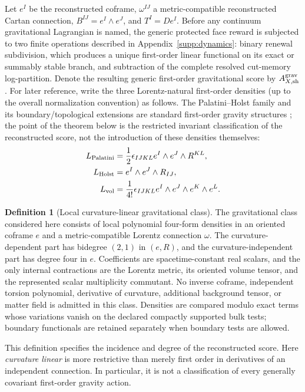 \documentclass[11pt]{article}
\numberwithin{equation}{section}
\theoremstyle{definition}
\newtheorem{definition}[definition]{Definition}
\theoremstyle{remark}
\begin{document}
Let $e^I$ be the reconstructed coframe, $\omega^{IJ}$ a metric-compatible
reconstructed Cartan connection, $B^{IJ}=e^I\wedge e^J$, and $T^I=De^I$.
Before any continuum gravitational Lagrangian is named, the generic protected
face reward is subjected to two finite operations described in
Appendix~\ref{supp:dynamics}: binary renewal subdivision, which produces a unique
first-order linear functional on its exact or summably stable branch, and
subtraction of the complete resolved cut-memory log-partition.  Denote the
resulting generic first-order gravitational score by $A^{\rm grav}_{X,\rm sh}$.
For later reference, write the three Lorentz-natural first-order densities (up
to the overall normalization convention) as follows.  The Palatini--Holst
family and its boundary/topological extensions are standard first-order
gravity structures \cite{Holst1996,CorichiReview}; the point of the theorem
below is the restricted invariant classification of the reconstructed score,
not the introduction of these densities themselves:
\begin{align}
 L_{\rm Palatini}
 &=\frac12\epsilon_{IJKL}e^I\wedge e^J\wedge R^{KL},\\
 L_{\rm Holst}
 &=e^I\wedge e^J\wedge R_{IJ},\\
 L_{\rm vol}
 &=\frac1{4!}\epsilon_{IJKL}
 e^I\wedge e^J\wedge e^K\wedge e^L.
 \label{eq:main-phv-densities}
\end{align}

\begin{definition}[Local curvature-linear gravitational class]
\label{def:main-gravitational-class}
The gravitational class considered here consists of local polynomial
four-form densities in an oriented coframe $e$ and a metric-compatible
Lorentz connection $\omega$. The curvature-dependent part has bidegree
$(2,1)$ in $(e,R)$, and the curvature-independent part has degree four in
$e$. Coefficients are spacetime-constant real scalars, and the only internal
contractions are the Lorentz metric, its oriented volume tensor, and the
represented scalar multiplicity commutant. No inverse coframe, independent
torsion polynomial, derivative of curvature, additional background tensor,
or matter field is admitted in this class. Densities are compared modulo
exact terms whose variations vanish on the declared compactly supported
bulk tests; boundary functionals are retained separately when boundary tests
are allowed.
\end{definition}

This definition specifies the incidence and degree of the reconstructed
score. Here \emph{curvature linear} is more restrictive than merely first
order in derivatives of an independent connection. In particular, it is not
a classification of every generally covariant first-order gravity action.
\end{document}
